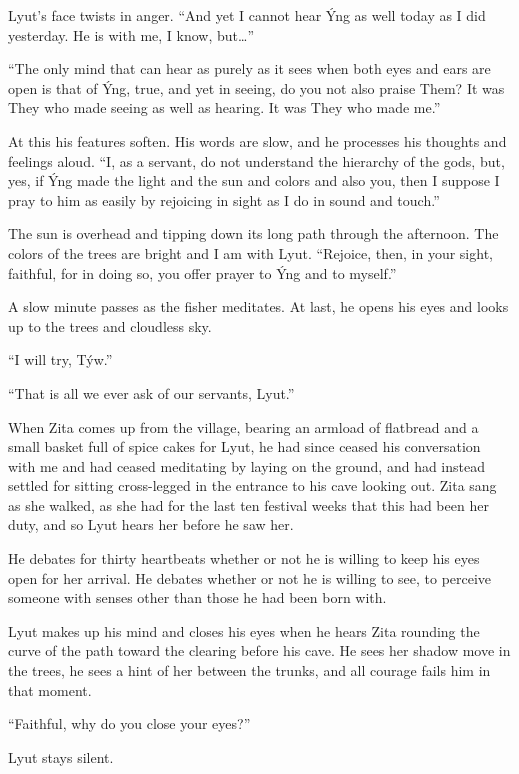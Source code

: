 Lyut's face twists in anger. ``And yet I cannot hear Ýng as well today as I did yesterday. He is with me, I know, but\ldots''

``The only mind that can hear as purely as it sees when both eyes and ears are open is that of Ýng, true, and yet in seeing, do you not also praise Them? It was They who made seeing as well as hearing. It was They who made me.''

At this his features soften. His words are slow, and he processes his thoughts and feelings aloud. ``I, as a servant, do not understand the hierarchy of the gods, but, yes, if Ýng made the light and the sun and colors and also you, then I suppose I pray to him as easily by rejoicing in sight as I do in sound and touch.''

The sun is overhead and tipping down its long path through the afternoon. The colors of the trees are bright and I am with Lyut. ``Rejoice, then, in your sight, faithful, for in doing so, you offer prayer to Ýng and to myself.''

A slow minute passes as the fisher meditates. At last, he opens his eyes and looks up to the trees and cloudless sky.

``I will try, Týw.''

``That is all we ever ask of our servants, Lyut.''

\secdiv

\noindent When Zita comes up from the village, bearing an armload of flatbread and a small basket full of spice cakes for Lyut, he had since ceased his conversation with me and had ceased meditating by laying on the ground, and had instead settled for sitting cross-legged in the entrance to his cave looking out. Zita sang as she walked, as she had for the last ten festival weeks that this had been her duty, and so Lyut hears her before he saw her.

He debates for thirty heartbeats whether or not he is willing to keep his eyes open for her arrival. He debates whether or not he is willing to see, to perceive someone with senses other than those he had been born with.

Lyut makes up his mind and closes his eyes when he hears Zita rounding the curve of the path toward the clearing before his cave. He sees her shadow move in the trees, he sees a hint of her between the trunks, and all courage fails him in that moment.

``Faithful, why do you close your eyes?''

Lyut stays silent.

